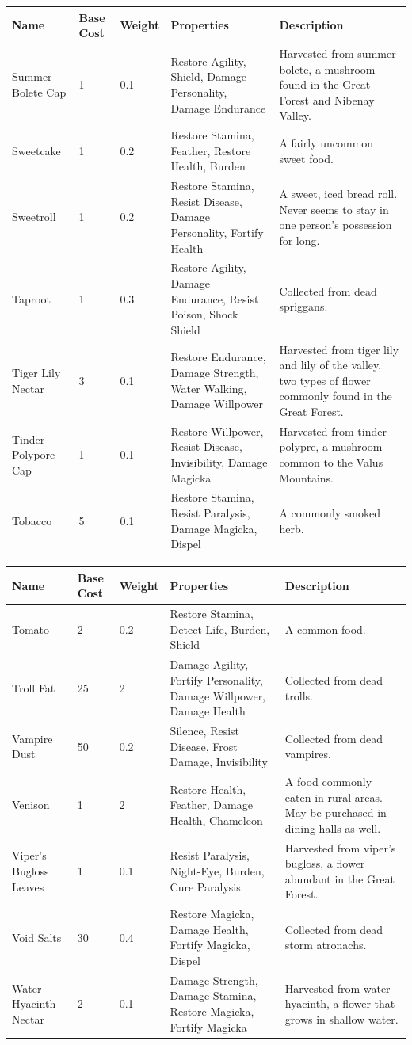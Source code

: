 \documentclass[12pt]{book}
\begin{document}
\begin{tabular}{|p{}|p{}|p{}|p{}|p{}|}
\hline
Name & Base Cost & Weight & Properties & Description\\ \hline
Summer Bolete Cap & 1 & 0.1 & Restore Agility, Shield, Damage Personality, Damage Endurance & Harvested from summer bolete, a mushroom found in the Great Forest and Nibenay Valley.\\ \hline
Sweetcake & 1 & 0.2 & Restore Stamina, Feather, Restore Health, Burden & A fairly uncommon sweet food.\\ \hline
Sweetroll & 1 & 0.2 & Restore Stamina, Resist Disease, Damage Personality, Fortify Health & A sweet, iced bread roll. Never seems to stay in one person's possession for long.\\ \hline
Taproot & 1 & 0.3 & Restore Agility, Damage Endurance, Resist Poison, Shock Shield & Collected from dead spriggans.\\ \hline
Tiger Lily Nectar & 3 & 0.1 & Restore Endurance, Damage Strength, Water Walking, Damage Willpower & Harvested from tiger lily and lily of the valley, two types of flower commonly found in the Great Forest.\\ \hline
Tinder Polypore Cap & 1 & 0.1 & Restore Willpower, Resist Disease, Invisibility, Damage Magicka & Harvested from tinder polypre, a mushroom common to the Valus Mountains.\\ \hline
Tobacco & 5 & 0.1 & Restore Stamina, Resist Paralysis, Damage Magicka, Dispel & A commonly smoked herb.\\ \hline
\end{tabular}

\begin{tabular}{|p{}|p{}|p{}|p{}|p{}|}
\hline
Name & Base Cost & Weight & Properties & Description\\ \hline
Tomato & 2 & 0.2 & Restore Stamina, Detect Life, Burden, Shield & A common food.\\ \hline
Troll Fat & 25 & 2 & Damage Agility, Fortify Personality, Damage Willpower, Damage Health & Collected from dead trolls.\\ \hline
Vampire Dust & 50 & 0.2 & Silence, Resist Disease, Frost Damage, Invisibility & Collected from dead vampires.\\ \hline
Venison & 1 & 2 & Restore Health, Feather, Damage Health, Chameleon & A food commonly eaten in rural areas. May be purchased in dining halls as well.\\ \hline
Viper's Bugloss Leaves & 1 & 0.1 & Resist Paralysis, Night-Eye, Burden, Cure Paralysis & Harvested from viper's bugloss, a flower abundant in the Great Forest.\\ \hline
Void Salts & 30 & 0.4 & Restore Magicka, Damage Health, Fortify Magicka, Dispel & Collected from dead storm atronachs.\\ \hline
Water Hyacinth Nectar & 2 & 0.1 & Damage Strength, Damage Stamina, Restore Magicka, Fortify Magicka & Harvested from water hyacinth, a flower that grows in shallow water.\\ \hline
\end{tabular}
\end{document}
